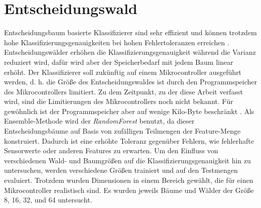 \section{Entscheidungswald}
\label{sec:model_dt}
Entscheidungsbaum basierte Klassifizierer sind sehr effizient und können trotzdem hohe Klassifizierungsgenauigkeiten bei hohen Fehlertoleranzen erreichen \cite{dymelThesis}.
Entscheidungswälder erhöhen die Klassifizierungsgenauigkeit während die Varianz reduziert wird, dafür wird aber der Speicherbedarf mit jedem Baum linear erhöht.
Der Klassifizierer soll zukünftig auf einem Mikrocontroller ausgeführt werden, d. h. die Größe des Entscheidungswaldes ist durch den Programmspeicher des Mikrocontrollers limitiert.
Zu dem Zeitpunkt, zu der diese Arbeit verfasst wird, sind die Limitierungen des Mikrocontrollers noch nicht bekannt.
Für gewöhnlich ist der Programmspeicher aber auf wenige Kilo-Byte beschränkt \cite{dymelThesis}.
\newline
\newline
Als Ensemble-Methode wird der \textit{RandomForest} benutzt, da dieser Entscheidungsbäume auf Basis von zufälligen Teilmengen der Feature-Menge konstruiert.
Dadurch ist eine erhöhte Toleranz gegenüber Fehlern, wie fehlerhafte Sensorwerte oder anderen Features zu erwarten.
\newline
\newline
Um den Einfluss von verschiedenen Wald- und Baumgrößen auf die Klassifizierungsgenauigkeit hin zu untersuchen, werden verschiedene Größen
trainiert und auf den Testmengen evaluiert. Trotzdem wurden Dimensionen in einem Bereich gewählt, die für einen Mikrocontroller realistisch sind.
Es wurden jeweils Bäume und Wälder der Größe 8, 16, 32, und 64 untersucht.